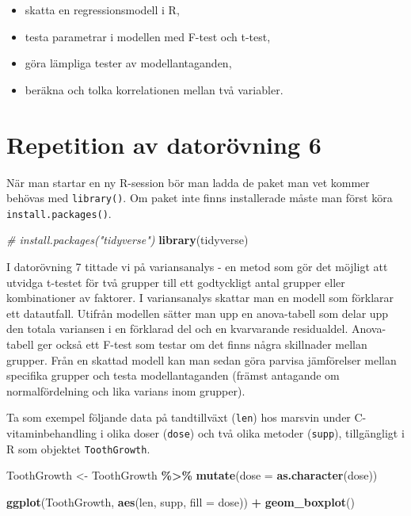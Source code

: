 \documentclass[
]{book}
\newenvironment{Shaded}{\begin{snugshade}}{\end{snugshade}}
\newcommand{\AttributeTok}[1]{\textcolor[rgb]{0.13,0.29,0.53}{#1}}
\newcommand{\CommentTok}[1]{\textcolor[rgb]{0.56,0.35,0.01}{\textit{#1}}}
\newcommand{\FunctionTok}[1]{\textcolor[rgb]{0.13,0.29,0.53}{\textbf{#1}}}
\newcommand{\NormalTok}[1]{#1}
\newcommand{\OtherTok}[1]{\textcolor[rgb]{0.56,0.35,0.01}{#1}}
\newcommand{\SpecialCharTok}[1]{\textcolor[rgb]{0.81,0.36,0.00}{\textbf{#1}}}
\theoremstyle{definition}
\theoremstyle{definition}
\theoremstyle{definition}
\theoremstyle{definition}
\theoremstyle{remark}
\begin{document}
\begin{itemize}
\item
  skatta en regressionsmodell i R,
\item
  testa parametrar i modellen med F-test och t-test,
\item
  göra lämpliga tester av modellantaganden,
\item
  beräkna och tolka korrelationen mellan två variabler.
\end{itemize}

\section{Repetition av datorövning 6}\label{repetition-av-datoruxf6vning-6}

När man startar en ny R-session bör man ladda de paket man vet kommer behövas med \texttt{library()}. Om paket inte finns installerade måste man först köra \texttt{install.packages()}.

\begin{Shaded}
\begin{Highlighting}[]
\CommentTok{\# install.packages("tidyverse")}
\FunctionTok{library}\NormalTok{(tidyverse)}
\end{Highlighting}
\end{Shaded}

I datorövning 7 tittade vi på variansanalys - en metod som gör det möjligt att utvidga t-testet för två grupper till ett godtyckligt antal grupper eller kombinationer av faktorer. I variansanalys skattar man en modell som förklarar ett datautfall. Utifrån modellen sätter man upp en anova-tabell som delar upp den totala variansen i en förklarad del och en kvarvarande residualdel. Anova-tabell ger också ett F-test som testar om det finns några skillnader mellan grupper. Från en skattad modell kan man sedan göra parvisa jämförelser mellan specifika grupper och testa modellantaganden (främst antagande om normalfördelning och lika varians inom grupper).

Ta som exempel följande data på tandtillväxt (\texttt{len}) hos marsvin under C-vitaminbehandling i olika doser (\texttt{dose}) och två olika metoder (\texttt{supp}), tillgängligt i R som objektet \texttt{ToothGrowth}.

\begin{Shaded}
\begin{Highlighting}[]
\NormalTok{ToothGrowth }\OtherTok{\textless{}{-}}\NormalTok{ ToothGrowth }\SpecialCharTok{\%\textgreater{}\%} \FunctionTok{mutate}\NormalTok{(}\AttributeTok{dose =} \FunctionTok{as.character}\NormalTok{(dose))}

\FunctionTok{ggplot}\NormalTok{(ToothGrowth, }\FunctionTok{aes}\NormalTok{(len, supp, }\AttributeTok{fill =}\NormalTok{ dose)) }\SpecialCharTok{+} 
  \FunctionTok{geom\_boxplot}\NormalTok{()}
\end{Highlighting}
\end{Shaded}
\end{document}
